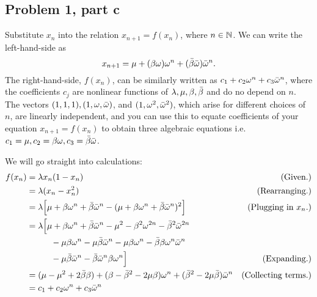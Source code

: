 \subsection{Problem 1, part c}
Substitute $x_n$ into the relation $x_{n+1} = f(x_n)$, where $n \in \mathbb{N}$. We can write the left-hand-side as 
\[
x_{n+1} = \mu + (\beta\omega)\omega^n + (\Bar{\beta}\Bar{\omega})\Bar{\omega}^n.
\]
The right-hand-side, $f(x_n)$, can be similarly written as $c_1 + c_2\omega^n + c_3\Bar{\omega}^n$, where the coefficients $c_j$ are nonlinear functions of $\lambda, \mu, \beta, \Bar{\beta}$ and do no depend on $n$. The vectors $(1, 1, 1), (1, \omega, \Bar{\omega})$, and $(1, \omega^2, \Bar{\omega}^2)$, which arise for different choices of $n$, are linearly independent, and you can use this to equate coefficients of your equation $x_{n+1} = f(x_n)$ to obtain three algebraic equations i.e. $c_1 = \mu, c_2 = \beta\omega, c_3 = \Bar{\beta}\Bar{\omega}$.
\partbreak
\begin{solution}

    We will go straight into calculations:
    \alignbreak
    \begin{align}
        f(x_n) &= \lm x_n(1 - x_n) &\text{(Given.)}\nonumber\\
        &= \lm (x_n - x_n^2) &\text{(Rearranging.)}\nonumber\\
        &= \lm\Big[ \mu + \beta\omega^n + \Bar{\beta}\Bar{\omega}^n - (\mu + \beta\omega^n + \Bar{\beta}\Bar{\omega}^n)^2\Big] &\text{(Plugging in $x_n$.)}\nonumber\\
        &= \lm\Big[ \mu + \beta\omega^n + \Bar{\beta}\Bar{\omega}^n - \mu^2 - \beta^2\omega^{2n} - \Bar{\beta}^2\Bar{\omega}^{2n}\nonumber\\
        & \hspace{10mm} - \mu\beta\omega^n - \mu\Bar{\beta}\Bar{\omega}^n - \mu\beta\omega^n - \Bar{\beta}\beta\omega^n \Bar{\omega}^n \nonumber\\
        & \hspace{10mm} - \mu\Bar{\beta}\Bar{\omega}^n - \Bar{\beta}\Bar{\omega}^n\beta\omega^n \Big] &\text{(Expanding.)}\nonumber\\
        &= (\mu - \mu^2 + 2\Bar{\beta}\beta) + (\beta - \Bar{\beta}^2 - 2\mu \beta)\omega^n + (\Bar{\beta}^2 - 2\mu\Bar{\beta})\bar{\omega}^n &\text{(Collecting terms.)}\nonumber\\
        &= c_1 + c_2\omega^n + c_3\bar{\omega}^n
    \end{align}

\end{solution}


